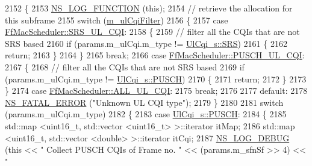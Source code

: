 \begin{DoxyCode}
2152 \{
2153   \hyperlink{log-macros-disabled_8h_a90b90d5bad1f39cb1b64923ea94c0761}{NS\_LOG\_FUNCTION} (\textcolor{keyword}{this});
2154 \textcolor{comment}{// retrieve the allocation for this subframe}
2155   \textcolor{keywordflow}{switch} (\hyperlink{classns3_1_1FfMacScheduler_adae16e66a1c4231da80a1221297442cf}{m\_ulCqiFilter})
2156     \{
2157     \textcolor{keywordflow}{case} \hyperlink{classns3_1_1FfMacScheduler_aa47a9eb25f2c558c825b0be645304a52af2e0df473ba2c8f9cb131cb760591aed}{FfMacScheduler::SRS\_UL\_CQI}:
2158       \{
2159         \textcolor{comment}{// filter all the CQIs that are not SRS based}
2160         \textcolor{keywordflow}{if} (params.m\_ulCqi.m\_type != \hyperlink{structns3_1_1UlCqi__s_aece9e5ebea42eb9ff1744c72c8459b57af4b6dba4243636562c910c4d4761dd7e}{UlCqi\_s::SRS})
2161           \{
2162             \textcolor{keywordflow}{return};
2163           \}
2164       \}
2165       \textcolor{keywordflow}{break};
2166     \textcolor{keywordflow}{case} \hyperlink{classns3_1_1FfMacScheduler_aa47a9eb25f2c558c825b0be645304a52a4a833bc779439b15bd904e1dd8eaa563}{FfMacScheduler::PUSCH\_UL\_CQI}:
2167       \{
2168         \textcolor{comment}{// filter all the CQIs that are not SRS based}
2169         \textcolor{keywordflow}{if} (params.m\_ulCqi.m\_type != \hyperlink{structns3_1_1UlCqi__s_aece9e5ebea42eb9ff1744c72c8459b57a9716b20a3095c473ae3fde1eb5d0bb63}{UlCqi\_s::PUSCH})
2170           \{
2171             \textcolor{keywordflow}{return};
2172           \}
2173       \}
2174     \textcolor{keywordflow}{case} \hyperlink{classns3_1_1FfMacScheduler_aa47a9eb25f2c558c825b0be645304a52a84059a597c72335f0a5963c3efcbda71}{FfMacScheduler::ALL\_UL\_CQI}:
2175       \textcolor{keywordflow}{break};
2176 
2177     \textcolor{keywordflow}{default}:
2178       \hyperlink{group__fatal_ga5131d5e3f75d7d4cbfd706ac456fdc85}{NS\_FATAL\_ERROR} (\textcolor{stringliteral}{"Unknown UL CQI type"});
2179     \}
2180 
2181   \textcolor{keywordflow}{switch} (params.m\_ulCqi.m\_type)
2182     \{
2183     \textcolor{keywordflow}{case} \hyperlink{structns3_1_1UlCqi__s_aece9e5ebea42eb9ff1744c72c8459b57a9716b20a3095c473ae3fde1eb5d0bb63}{UlCqi\_s::PUSCH}:
2184       \{
2185         std::map <uint16\_t, std::vector <uint16\_t> >::iterator itMap;
2186         std::map <uint16\_t, std::vector <double> >::iterator itCqi;
2187         \hyperlink{group__logging_ga413f1886406d49f59a6a0a89b77b4d0a}{NS\_LOG\_DEBUG} (\textcolor{keyword}{this} << \textcolor{stringliteral}{" Collect PUSCH CQIs of Frame no. "} << (params.m\_sfnSf >> 4) << \textcolor{stringliteral}{"
}
\end{DoxyCode}
